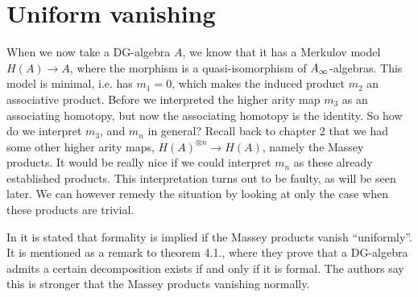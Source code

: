 \section{Uniform vanishing}

When we now take a DG-algebra $A$, we know that it has a Merkulov model $H(A)\longrightarrow A$, where the morphism is a quasi-isomorphism of $A_{\infty}$-algebras. This model is minimal, i.e. has $m_1 = 0$, which makes the induced product $m_2$ an associative product. Before we interpreted the higher arity map $m_3$ as an associating homotopy, but now the associating homotopy is the identity. So how do we interpret $m_3$, and $m_n$ in general? Recall back to chapter 2 that we had some other higher arity maps, $H(A)^{\otimes n}\longrightarrow H(A)$, namely the Massey products. It would be really nice if we could interpret $m_n$ as these already established products. This interpretation turns out to be faulty, as will be seen later. We can however remedy the situation by looking at only the case when these products are trivial. 

In \cite{DGMS} it is stated that formality is implied if the Massey products vanish ``uniformly''. It is mentioned as a remark to theorem 4.1., where they prove that a DG-algebra admits a certain decomposition exists if and only if it is formal. The authors say this is stronger that the Massey products vanishing normally. 





